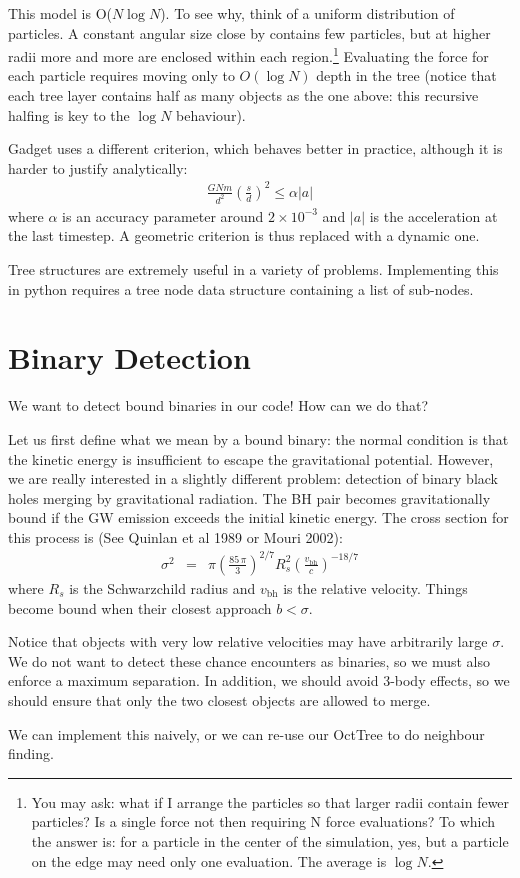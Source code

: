 \documentclass[12pt]{article}
\begin{document}
This model is O($N \log N$). To see why, think of a uniform distribution of particles. A constant angular size close by contains few particles, but at higher radii more and more are enclosed within each region.\footnote{You may ask: what if I arrange the particles so that larger radii contain fewer particles? Is a single force not then requiring N force evaluations? To which the answer is: for a particle in the center of the simulation, yes, but a particle on the edge may need only one evaluation. The average is $\log N$.} Evaluating the force for each particle requires moving only to $O(\log N)$ depth in the tree (notice that each tree layer contains half as many objects as the one above: this recursive halfing is key to the $\log N$ behaviour).

Gadget uses a different criterion, which behaves better in practice, although it is harder to justify analytically:
\begin{align}
 \frac{G N m}{d^2} \left(\frac{s}{d}\right)^2 \leq \alpha |a|
\end{align}
where $\alpha$ is an accuracy parameter around $2 \times 10^{-3}$ and $|a|$ is the acceleration at the last timestep. A geometric criterion is thus replaced with a dynamic one.

Tree structures are extremely useful in a variety of problems. Implementing this in python requires a tree node data structure containing a list of sub-nodes.

\section{Binary Detection}

We want to detect bound binaries in our code! How can we do that?

Let us first define what we mean by a bound binary: the normal condition is that the kinetic energy is insufficient to escape the gravitational potential. However, we are really interested in a slightly different problem: detection of binary black holes merging by gravitational radiation. The BH pair becomes gravitationally bound if the GW
emission exceeds the initial kinetic energy. The cross
section for this process is (See Quinlan et al 1989 or Mouri 2002):
\begin{eqnarray}
     \sigma^2 &=& \pi \left( \frac{85\, \pi}{3}
     \right)^{2/7} R_{s}^2 \left(\frac{v_\mathrm{bh}}{c}\right)^{-18/7}
\label{eqn:crosssection}
\end{eqnarray}
where $R_s$ is the Schwarzchild radius and $v_\mathrm{bh}$ is the relative velocity. Things become bound when their closest approach $b < \sigma$.

Notice that objects with very low relative velocities may have arbitrarily large $\sigma$. We do not want to detect these chance encounters as binaries, so we must also enforce a maximum separation. In addition, we should avoid 3-body effects, so we should ensure that only the two closest objects are allowed to merge.

We can implement this naively, or we can re-use our OctTree to do neighbour finding.
\end{document}
